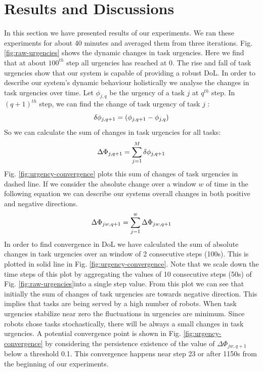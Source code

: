 \documentclass{llncs}
\begin{document}
\section{Results and Discussions}
\label{sec:results}
In this section we have presented results of our experiments. We ran these experiments for about 40 minutes and averaged them from three iterations. 
Fig. \ref{fig:raw-urgencies} shows the dynamic changes in task urgencies. Here we find that at about $100^{th}$ step all urgencies has reached at 0. The rise and fall of task urgencies show that our system is capable of providing a robust DoL. 
In order to describe our system's dynamic behaviour holistically we analyse the changes in task urgencies over time. Let $ \phi_{j, q}$ be the urgency of a task $j$ at $q^{th}$ step. In $(q+1)^{th}$ step, we can find the change of task urgency of task $j$ :\\
\begin{equation} 
\small
\delta \phi_{j, q+1} = ( \phi_{j, q+1} - \phi_{j, q}) 
\end{equation}
So we can calculate the sum of changes in task urgencies for all tasks:
\begin{equation} 
\small
\Delta \Phi_{j, q+1} = \sum_{j=1}^{M} \delta \phi_{j, q+1} 
\label{eqn:Delta-Phi}
\end{equation}
Fig. \ref{fig:urgency-convergence} plots this sum of changes of task urgencies in dashed line. If we consider the absolute change over a window $w$ of time in the following equation we can describe our systems overall changes in both positive and negative directions.
%
\begin{equation}
\small
\Delta \Phi_{jw, q+1} = \sum_{j=1}^{w} \Delta \Phi_{jw, q+1} 
\end{equation}
%
In order to find convergence in DoL we have calculated the sum of absolute changes in task urgencies over an window of 2 consecutive steps (100s). This is plotted in solid line in Fig. \ref{fig:urgency-convergence}. Note that we scale down the time steps of this plot by aggregating the values of 10 consecutive steps (50s) of Fig. \ref{fig:raw-urgencies}into a single step value.
From this plot we can see that initially the sum of changes of task urgencies are towards negative direction. This implies that tasks are being served by a high number of robots. When task urgencies stabilize near zero the fluctuations in urgencies are minimum. Since robots chose tasks stochastically, there will be always a small changes in task urgencies. A potential convergence point is shown in Fig. \ref{fig:urgency-convergence} by considering the persistence existence of the value of $\Delta \Phi_{jw, q+1}$ below a threshold 0.1. This convergence happens near step 23 or after 1150s from the beginning of our experiments.\\
\end{document}
